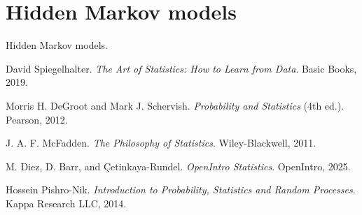 \documentclass{book}
\begin{document}
\newpage

\section{Hidden Markov models}
Hidden Markov models.


\backmatter
 
\begin{thebibliography}{999}

David Spiegelhalter. 
\textit{The Art of Statistics: How to Learn from Data}. 
Basic Books, 2019.

Morris H. DeGroot and Mark J. Schervish.
\textit{Probability and Statistics} (4th ed.).
Pearson, 2012.

J. A. F. McFadden.
\textit{The Philosophy of Statistics}.
Wiley-Blackwell, 2011.

M. Diez, D. Barr, and Çetinkaya-Rundel.
\textit{OpenIntro Statistics}.
OpenIntro, 2025.

Hossein Pishro-Nik.
\textit{Introduction to Probability, Statistics and Random Processes}.
Kappa Research LLC, 2014.

\end{thebibliography}
\end{document}
